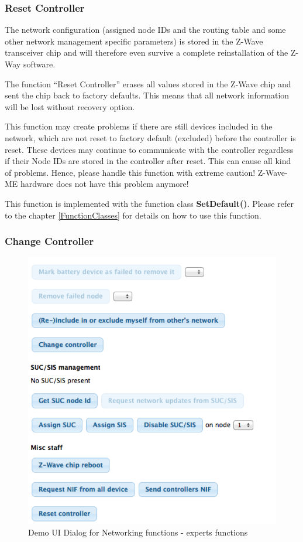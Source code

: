 \subsubsection{Reset Controller}

The network configuration (assigned node IDs and the routing table and some other network management specific parameters) is stored in the Z-Wave 
transceiver chip and will therefore even survive a complete reinstallation of the Z-Way software.

The function “Reset Controller” erases all values stored in the Z-Wave chip and sent the chip back to factory defaults. This means that all network 
information will be lost without recovery option.

This function may create problems if there are still devices included in the network, which are not reset to factory default (excluded) before the 
controller is reset. These devices may continue to communicate with the controller regardless if their Node IDs are stored in the controller after 
reset. This can cause all kind of problems. Hence, please handle this function with extreme caution!  
Z-Wave-ME hardware does not have this problem anymore!


This function is implemented with the function class {\bf SetDefault()}. Please refer to the chapter \ref{FunctionClasses} for details on how to use this function.

\subsubsection{Change Controller }


\begin{figure} 
\begin{center}
\includegraphics[scale=0.8]{pics/network2.png}
\caption{Demo UI Dialog for Networking functions - experts functions}
\label{c1:network2} 
\end{center} \end{figure}


